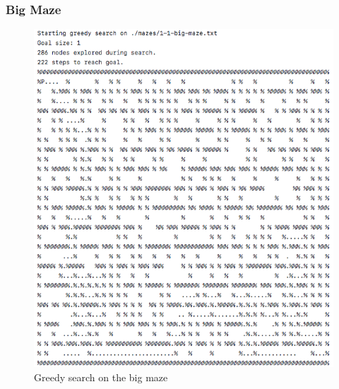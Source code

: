 \documentclass[titlepage]{article}
\begin{document}
\subsubsection{Big Maze}
\begin{figure}[h!]
\includegraphics[width=\linewidth]{greedybig.png}
\caption{Greedy search on the big maze}
\label{fig:GREEDYbig}
\end{figure}

\newpage
\end{document}
